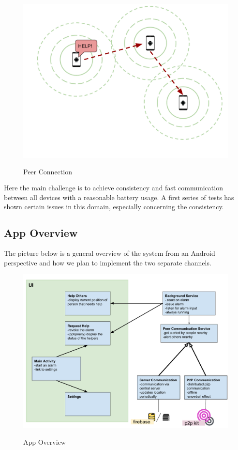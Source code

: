 \documentclass{report}
\newcommand{\lfig}[1]{\label{fig:#1}}
\begin{document}
\begin{figure}[h]
	\centering
    \includegraphics[width=\columnwidth]{P2P.pdf}
    \lfig{peer-connection}
    \vspace{-5mm} %
	\caption{Peer Connection}
\end{figure}

Here the main challenge is to achieve consistency and fast communication between all devices with a reasonable battery usage. A first series of tests has shown certain issues in this domain, especially concerning the consistency.

\subsection{App Overview}
The picture below is a general overview of the system from an Android perspective and how we plan to implement the two separate channels.

\begin{figure}[h]
	\centering
    \includegraphics[width=\columnwidth]{AppOverview.pdf}
    \lfig{app-overview}
    \vspace{-5mm} %
	\caption{App Overview}
\end{figure}
\end{document}

